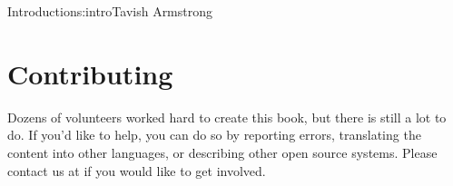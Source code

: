 \begin{aosachapter}{Introduction}{s:intro}{Tavish Armstrong}
\section*{Contributing}


Dozens of volunteers worked hard to create this book,
but there is still a lot to do.
If you'd like to help,
you can do so by reporting errors,
translating the content into other languages,
or describing other open source systems.
Please contact us at  if you would like to get involved.

\end{aosachapter}

